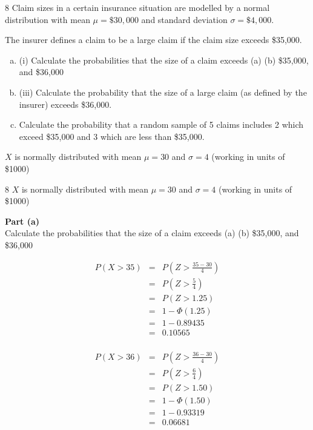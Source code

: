 \documentclass[a4paper,12pt]{article}
\begin{document}
8
Claim sizes in a certain insurance situation are modelled by a normal distribution with
mean $\mu = \$30,000$ and standard deviation $\sigma = \$4,000$.

 The insurer defines a claim to
be a large claim if the claim size exceeds \$35,000.
\begin{enumerate}[(a)]
\item (i)
Calculate the probabilities that the size of a claim exceeds
(a)
(b)
\$35,000, and
\$36,000

\item 
(iii)
Calculate the probability that the size of a large claim (as defined by the
insurer) exceeds \$36,000.
\item 
Calculate the probability that a random sample of 5 claims includes 2 which
exceed \$35,000 and 3 which are less than \$35,000.
\end{enumerate}


$X$ is normally distributed with mean $\mu = 30$ and $\sigma = 4$ (working in units of \$1000)

\newpage
8
$X$ is normally distributed with mean $\mu = 30$ and $\sigma = 4$ (working in units of \$1000)

\begin{framed}
\noindent \textbf{Part (a)}\\ \large
\noindent Calculate the probabilities that the size of a claim exceeds
(a)
(b)
\$35,000, and
\$36,000


\end{framed}
\large
\noindent 
\begin{eqnarray*}
P ( X > 35 ) &=& P \left( Z >\frac{35 − 30}{4} \right) \\
&=& P \left( Z >\frac{5}{4} \right) \\
&=& P ( Z > 1.25 ) \\ 
&=& 1 - \Phi (1.25 ) \\ 
&=& 1 − 0.89435 \\
&=& 0.10565\\
\end{eqnarray*}
 

\begin{eqnarray*}
P ( X > 36 ) &=& P \left( Z >\frac{36 − 30}{4} \right) \\
&=& P \left( Z >\frac{6}{4} \right) \\
&=& P ( Z > 1.50 ) \\ 
&=& 1 - \Phi (1.50) \\ 
&=& 1 − 0.93319 \\
&=& 0.06681\\
\end{eqnarray*}
\newpage
\end{document}
